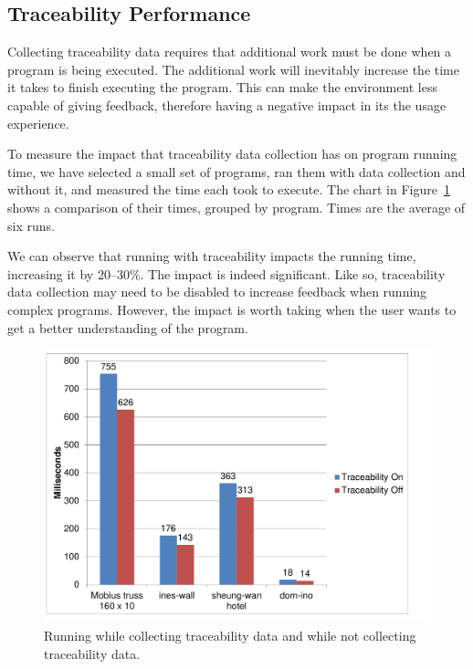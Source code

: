 \subsection{Traceability Performance}
Collecting traceability data requires that additional work must be done when a program is being executed.
The additional work will inevitably increase the time it takes to finish executing the program.
This can make the environment less capable of giving feedback, therefore having a negative impact in its the usage experience.

To measure the impact that traceability data collection has on program running time, we have selected a small set of programs, ran them with data collection and without it, and measured the time each took to execute.
The chart in Figure~\ref{fig:traceability:timing} shows a comparison of their times, grouped by program.
Times are the average of six runs.

We can observe that running with traceability impacts the running time, increasing it by 20--30\%.
The impact is indeed significant.
Like so, traceability data collection may need to be disabled to increase feedback when running complex programs.
However, the impact is worth taking when the user wants to get a better understanding of the program.

\begin{figure}
  \centering
  \includegraphics[width=12cm]{./images/traceability_timing}
  \caption{Running while collecting traceability data and while not collecting traceability data.}
  \label{fig:traceability:timing}
\end{figure}






